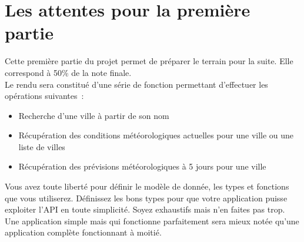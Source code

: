 \documentclass[a4paper,11pt]{scrartcl}
\begin{document}
\section*{Les attentes pour la première partie}

Cette première partie du projet permet de préparer le terrain pour la suite. Elle correspond à 50\% de la note finale.\\

Le rendu sera constitué d'une série de fonction permettant d'effectuer les opérations suivantes :
\begin{itemize}
\item Recherche d'une ville à partir de son nom
\item Récupération des conditions météorologiques actuelles pour une ville ou une liste de villes
\item Récupération des prévisions météorologiques à 5 jours pour une ville
\end{itemize}

Vous avez toute liberté pour définir le modèle de donnée, les types et fonctions que vous utiliserez. Définissez les bons types pour que votre application puisse exploiter l'API en toute simplicité. Soyez exhaustifs mais n'en faites pas trop. Une application simple mais qui fonctionne parfaitement sera mieux notée qu'une application complète fonctionnant à moitié.
\end{document}
